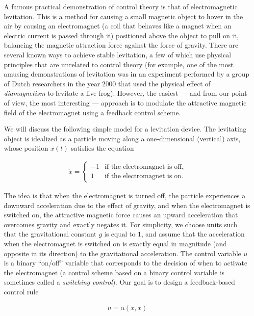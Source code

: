 \documentclass[11pt]{report}
\theoremstyle{plain}
\theoremstyle{definition}
\begin{document}
A famous practical demonstration of control theory is
that of electromagnetic levitation. This is a method
for causing a small magnetic object to hover in the
air by causing an electromagnet (a coil that behaves
like a magnet when an electric current is passed
through it) positioned above the object to pull on it,
balancing the magnetic attraction force against the
force of gravity. There are several known ways to
achieve stable levitation, a few of which use physical
principles that are unrelated to control theory (for
example, one of the most amusing demonstrations of
levitation was in an experiment performed by a group
of Dutch researchers in the year 2000 that used the
physical effect of \emph{diamagnetism} to levitate a live
frog). However, the easiest --- and from our point of
view, the most interesting --- approach is to modulate
the attractive magnetic field of the electromagnet
using a feedback control scheme.

We will discuss the following simple model for a
levitation device. The levitating object is idealized
as a particle moving along a one-dimensional
(vertical) axis, whose position $x(t)$ satisfies the
equation

\begin{align*}
\ddot{x} = \begin{cases} -1 & \textrm{if the electromagnet is off}, \\
1 & \textrm{if the electromagnet is on.}
\end{cases}
\end{align*}

\noindent The idea is that when the electromagnet is turned off,
the particle experiences a downward acceleration due
to the effect of gravity, and when the electromagnet
is switched on, the attractive magnetic force causes
an upward acceleration that overcomes gravity and
exactly negates it. For simplicity, we choose units
such that the gravitational constant $g$ is equal to
$1$, and assume that the acceleration when the
electromagnet is switched on is exactly equal in
magnitude (and opposite in its direction) to the
gravitational acceleration. The control variable $u$
is a binary ``on/off'' variable that corresponds to
the decision of when to activate the electromagnet (a
control scheme based on a binary control variable is
sometimes called a \emph{switching control}). Our goal is
to design a feedback-based control rule

\begin{align*}
u = u(x, \dot{x})
\end{align*}
\end{document}
